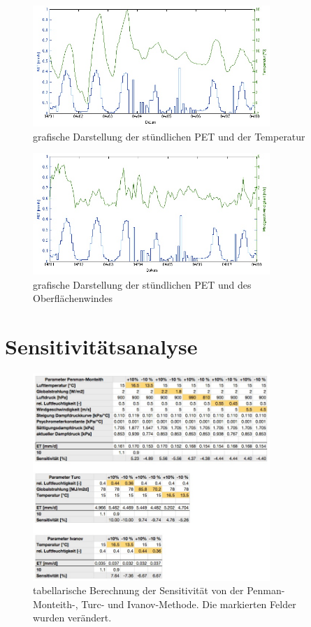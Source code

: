 \begin{appendix}
\begin{figure}[H]
\centering
\includegraphics[width=0.8\textwidth]{figures/lys1_aet_temp_h.jpg}
\caption{grafische Darstellung der stündlichen PET und der Temperatur}
\label{fig:aet_temp}
\end{figure}

\begin{figure}[H]
\centering
\includegraphics[width=0.8\textwidth]{figures/lys1_aet_wind_h.jpg}
\caption{grafische Darstellung der stündlichen PET und des Oberflächenwindes}
\label{fig:aet_wind}
\end{figure}

\section{Sensitivitätsanalyse}
\label{sec:sensitivitaet}

\begin{figure}[H]
\centering
\includegraphics[width=0.8\textwidth]{figures/sensitivitaet.jpg}
\caption{tabellarische Berechnung der Sensitivität von der Penman-Monteith-, Turc- und Ivanov-Methode. Die markierten Felder wurden  verändert.}
\label{fig:sensitivitaet}
\end{figure}


\end{appendix}